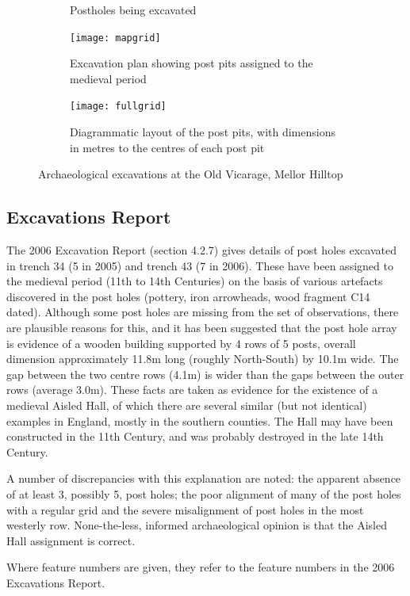 \documentclass[letterpaper,11pt,titlepage]{article}
\begin{document}
{\begin{figure}
\begin{subfigure}[b]{0.30\textwidth}
		\caption{Postholes being excavated}
		\label{fig:corner}
	\end{subfigure}
	\begin{subfigure}[b]{0.45\textwidth}
		\texttt{[image: mapgrid]}
		\caption{Excavation plan showing post pits assigned to the medieval period}
		\label{fig:plan}
	\end{subfigure}
	\begin{subfigure}[b]{0.45\textwidth}
		\texttt{[image: fullgrid]}
		\caption{Diagrammatic layout of the post pits, with dimensions in metres to the centres of each post pit}
		\label{fig:layout}
	\end{subfigure}
	\caption{Archaeological excavations at the Old Vicarage, Mellor Hilltop}\label{fig:excavations}
\end{figure}

\subsection{Excavations Report}
The 2006 Excavation Report (section 4.2.7) gives details of post holes excavated in trench 34 (5 in 2005) and trench 43 (7 in 2006). These have been assigned to the medieval period (11th to 14th Centuries) on the basis of various artefacts discovered in the post holes (pottery, iron arrowheads, wood fragment C14 dated). Although some post holes are missing from the set of observations, there are plausible reasons for this, and it has been suggested that the post hole array is evidence of a wooden building supported by 4 rows of 5 posts, overall dimension approximately 11.8m long (roughly North-South) by 10.1m wide. The gap between the two centre rows (4.1m) is wider than the gaps between the outer rows (average 3.0m). These facts are taken as evidence for the existence of a medieval Aisled Hall, of which there are several similar (but not identical) examples in England, mostly in the southern counties. The Hall may have been constructed in the 11th Century, and was probably destroyed in the late 14th Century.

A number of discrepancies with this explanation are noted: the apparent absence of at least 3, possibly 5, post holes; the poor alignment of many of the post holes with a regular grid and the severe misalignment of post holes in the most westerly row. None-the-less, informed archaeological opinion is that the Aisled Hall assignment is correct.

Where feature numbers are given, they refer to the feature numbers in the 2006 Excavations Report.

}
\end{document}
